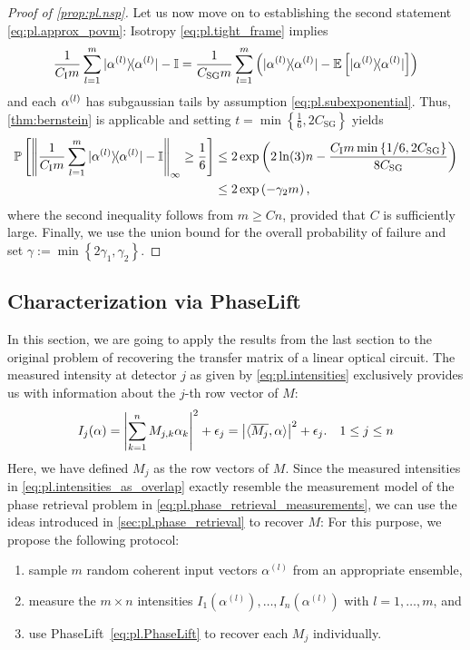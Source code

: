 \begin{proof}[Proof of \cref{prop:pl.nsp}]
  Let us now move on to establishing the second statement \eqref{eq:pl.approx_povm}:
  Isotropy \eqref{eq:pl.tight_frame} implies
  \begin{align}
    \frac{1}{ C_\mathrm{I} m} \sum_{l=1}^m \ketbra{\alpha\ind{l}} - \mathbb{I}
    = \frac{1}{C_\mathrm{SG} m} \sum_{l=1}^m \left( \ketbra{\alpha\ind{l}} - \mathbb{E} \left[ \ketbra{\alpha\ind{l}} \right] \right)
  \end{align}
  and each $\alpha^{(l)}$ has subgaussian tails by assumption \eqref{eq:pl.subexponential}.
  Thus, \cref{thm:bernstein} is applicable and setting $t= \min \left\{\frac{1}{6},2 C_\mathrm{SG} \right\}$ yields
  \begin{align}
    \Prob \left[ \left\| \frac{1}{C_\mathrm{I} m} \sum_{l=1}^m \ketbra{\alpha\ind{l}} -  \mathbb{I} \right\|_\infty \geq \frac{1}{6} \right]
    & \leq 2 \exp \left( 2 \ln (3) n - \frac{C_\mathrm{I} m \min\left\{ 1/6, 2 C_\mathrm{SG} \right\}}{8 C_\mathrm{SG}} \right) \\
    & \leq 2 \exp \left( - \gamma_2 m \right),
  \end{align}
  where the second inequality follows from $m \geq C n$, provided that $C$ is sufficiently large.
  Finally, we use the union bound  for the overall probability of failure and set $\gamma := \min \left\{ 2 \gamma_1,\gamma_2 \right\}$.
\end{proof}


\subsection{Characterization via PhaseLift}%
\label{sub:pl.characterization}

In this section, we are going to apply the results from the last section to the original problem of recovering the transfer matrix of a linear optical circuit.
The measured intensity at detector $j$ as given by \cref{eq:pl.intensities} exclusively provides us with information about the $j$-th row vector of ${M}$:
\[
  I_j({\alpha})
  = \left| \sum_{k=1}^n M_{j,k} \alpha_k \right|^2 + \epsilon_j
  = \left\vert  \langle \overline{{M}_j}, \alpha \rangle  \right\vert^2 + \epsilon_j. \quad 1 \leq j \leq n
  \label{eq:pl.intensities_as_overlap}
\]
Here, we have defined ${M}_j$ as the row vectors of ${M}$.
Since the measured intensities in \cref{eq:pl.intensities_as_overlap} exactly resemble the measurement model of the phase retrieval problem in \cref{eq:pl.phase_retrieval_measurements}, we can use the ideas introduced in \cref{sec:pl.phase_retrieval} to recover $M$:
For this purpose, we propose the following protocol:
\begin{enumerate}
  \item sample $m$ random coherent input vectors $\alpha^{(l)}$ from an appropriate ensemble,
  \item measure the $m \times n$ intensities $I_1(\alpha^{(l)}), \ldots, I_n ( \alpha^{(l)})$ with $l=1,\ldots,m$, and
  \item use PhaseLift~\eqref{eq:pl.PhaseLift} to recover each ${M}_j$ individually.
\end{enumerate}

